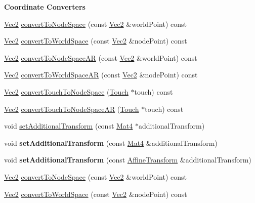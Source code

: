 \begin{Indent}\textbf{ Coordinate Converters}\par
\begin{DoxyCompactItemize}
\item 
\hyperlink{classVec2}{Vec2} \hyperlink{classNode_ae7bffc192b6e9b24871108d472a0e85a}{convert\+To\+Node\+Space} (const \hyperlink{classVec2}{Vec2} \&world\+Point) const
\item 
\hyperlink{classVec2}{Vec2} \hyperlink{classNode_a9da42e3d980d42aa9508a9de1b51040b}{convert\+To\+World\+Space} (const \hyperlink{classVec2}{Vec2} \&node\+Point) const
\item 
\hyperlink{classVec2}{Vec2} \hyperlink{classNode_a9c7e573a38882cc0727c5f8f65cd9187}{convert\+To\+Node\+Space\+AR} (const \hyperlink{classVec2}{Vec2} \&world\+Point) const
\item 
\hyperlink{classVec2}{Vec2} \hyperlink{classNode_a84c532f970a06aec83dc881e70526b8e}{convert\+To\+World\+Space\+AR} (const \hyperlink{classVec2}{Vec2} \&node\+Point) const
\item 
\hyperlink{classVec2}{Vec2} \hyperlink{classNode_a6ff92b98917dbaea150b90b578a84fca}{convert\+Touch\+To\+Node\+Space} (\hyperlink{classTouch}{Touch} $\ast$touch) const
\item 
\hyperlink{classVec2}{Vec2} \hyperlink{classNode_af9a987bf0d6590367c254e78426773af}{convert\+Touch\+To\+Node\+Space\+AR} (\hyperlink{classTouch}{Touch} $\ast$touch) const
\item 
void \hyperlink{classNode_a7375e0112b9bf3e5ace5afb32a5cd044}{set\+Additional\+Transform} (const \hyperlink{classMat4}{Mat4} $\ast$additional\+Transform)
\item 
\mbox{\label{classNode_a1f377b57a7924d17caa0d012306feb09}} 
void {\bfseries set\+Additional\+Transform} (const \hyperlink{classMat4}{Mat4} \&additional\+Transform)
\item 
\mbox{\label{classNode_ab7758edc645887a1f811ef9d680df64a}} 
void {\bfseries set\+Additional\+Transform} (const \hyperlink{structAffineTransform}{Affine\+Transform} \&additional\+Transform)
\item 
\hyperlink{classVec2}{Vec2} \hyperlink{classNode_ae7bffc192b6e9b24871108d472a0e85a}{convert\+To\+Node\+Space} (const \hyperlink{classVec2}{Vec2} \&world\+Point) const
\item 
\hyperlink{classVec2}{Vec2} \hyperlink{classNode_a9da42e3d980d42aa9508a9de1b51040b}{convert\+To\+World\+Space} (const \hyperlink{classVec2}{Vec2} \&node\+Point) const

\end{DoxyCompactItemize}
\end{Indent}

